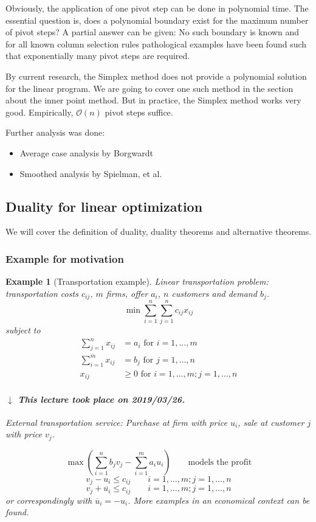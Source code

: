 \documentclass[a4paper]{article}
\numberwithin{lecref}{subsection}
\newtheorem*{Example}{Example}
\newcommand{\dateref}[1]{%
  \begin{mdframed}[backgroundcolor=gray!10,innerbottommargin=0pt,innertopmargin=0pt]
    \paragraph{\textit{$\downarrow$ This lecture took place on #1.}}%
  \end{mdframed}%
}
\begin{document}
Obviously, the application of one pivot step can be done in polynomial time.
The essential question is, does a polynomial boundary exist for the maximum number of pivot steps?
A partial answer can be given: No such boundary is known and for all known column selection rules pathological examples have been found such that exponentially many pivot steps are required.

By current research, the Simplex method does not provide a polynomial solution for the linear program.
We are going to cover one such method in the section about the inner point method.
But in practice, the Simplex method works very good.
Empirically, $\mathcal O(n)$ pivot steps suffice.

Further analysis was done:
\begin{itemize}
	\item Average case analysis by Borgwardt
	\item Smoothed analysis by Spielman, et al.
\end{itemize}

\subsection{Duality for linear optimization}
\label{section:1.4}

We will cover the definition of duality, duality theorems and alternative theorems.

\subsubsection{Example for motivation}
\label{section:1.4.1}

\begin{Example}[Transportation example]
	Linear transportation problem: transportation costs $c_{ij}$, $m$ firms, offer $a_i$, $n$ customers and demand $b_j$.
	\[ \min \sum_{i=1}^n \sum_{j=1}^n c_{ij} x_{ij} \]
	subject to
	\begin{align*}
		\sum_{j=1}^n x_{ij} &= a_i \text{ for } i = 1, \dots, m \\
		\sum_{i=1}^m x_{ij} &= b_j \text{ for } j = 1, \dots, n \\
		x_{ij} &\geq 0 \text{ for } i = 1, \dots, m; j = 1, \dots, n
	\end{align*}

	\dateref{2019/03/26}

	External transportation service:
	Purchase at firm with price $u_i$, sale at customer $j$ with price $v_j$.

	\[ \max \left(\sum_{i=1}^n b_j v_j - \sum_{i=1}^m a_i u_i\right) \qquad \text{models the profit} \]
	\[ v_j - u_i \leq c_{ij} \qquad i = 1, \dots, m; j = 1, \dots, n \]
	\[ v_j + \overline{u_i} \leq c_{ij} \qquad i = 1, \dots, m; j = 1, \dots, n \]
	or correspondingly with $\overline{u}_i = -u_i$.
	More examples in an economical context can be found.
\end{Example}
\end{document}
